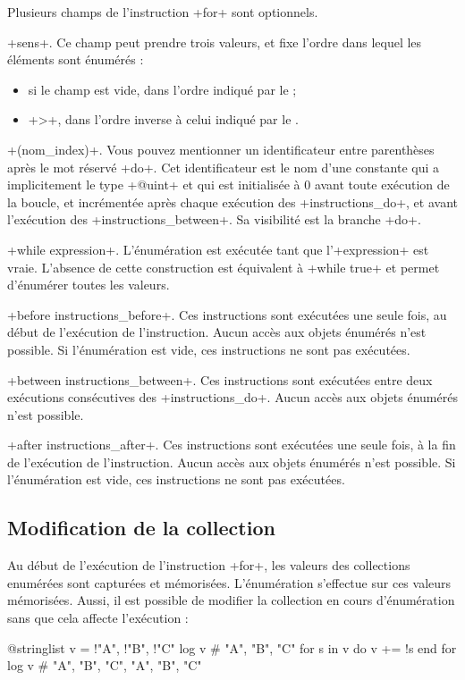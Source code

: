Plusieurs champs de l'instruction \ggs+for+ sont optionnels.


\ggs+sens+. Ce champ peut prendre trois valeurs, et fixe l'ordre dans lequel les éléments sont énumérés :
\begin{itemize}
  \item si le champ est vide, dans l'ordre indiqué par le  ;
  \item \ggs+>+, dans l'ordre inverse à celui indiqué par le .
\end{itemize}


\ggs+(nom_index)+. Vous pouvez mentionner un identificateur entre parenthèses après le mot réservé \ggs+do+. Cet identificateur est le nom d'une constante qui a implicitement le type \ggs+@uint+ et qui est initialisée à 0 avant toute exécution de la boucle, et incrémentée après chaque exécution des \ggs+instructions_do+, et avant l'exécution des \ggs+instructions_between+. Sa visibilité est la branche \ggs+do+.

\ggs+while expression+. L'énumération est exécutée tant que l'\ggs+expression+ est vraie. L'absence de cette construction est équivalent à \ggs+while true+ et permet d'énumérer toutes les valeurs.


\ggs+before instructions_before+. Ces instructions sont exécutées une seule fois, au début de l'exécution de l'instruction. Aucun accès aux objets énumérés n'est possible. Si l'énumération est vide, ces instructions ne sont pas exécutées.

\ggs+between instructions_between+. Ces instructions sont exécutées entre deux exécutions consécutives des \ggs+instructions_do+. Aucun accès aux objets énumérés n'est possible.

\ggs+after instructions_after+. Ces instructions sont exécutées une seule fois, à la fin de l'exécution de l'instruction. Aucun accès aux objets énumérés n'est possible. Si l'énumération est vide, ces instructions ne sont pas exécutées.


\subsection{Modification de la collection}

Au début de l'exécution de l'instruction \ggs+for+, les valeurs des collections enumérées sont capturées et mémorisées. L'énumération s'effectue sur ces valeurs mémorisées. Aussi, il est possible de modifier la collection en cours d'énumération sans que cela affecte l'exécution :
\begin{galgas}
@stringlist v = {!"A", !"B", !"C"}
log v # "A", "B", "C"
for s in v do
  v += !s
end for
log v # "A", "B", "C", "A", "B", "C"
\end{galgas}




















